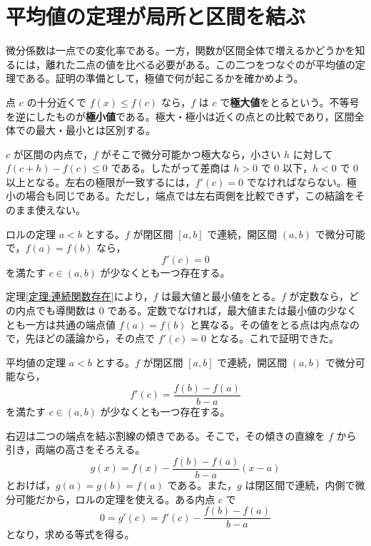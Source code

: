 \section{平均値の定理が局所と区間を結ぶ}\label{節:平均値定理}
微分係数は一点での変化率である。一方，関数が区間全体で増えるかどうかを知るには，離れた二点の値を比べる必要がある。この二つをつなぐのが平均値の定理である。証明の準備として，極値で何が起こるかを確かめよう。

点 $c$ の十分近くで $f(x)\le f(c)$ なら，$f$ は $c$ で\textbf{極大値}をとるという。不等号を逆にしたものが\textbf{極小値}である。極大・極小は近くの点との比較であり，区間全体での最大・最小とは区別する。

$c$ が区間の内点で，$f$ がそこで微分可能かつ極大なら，小さい $h$ に対して $f(c+h)-f(c)\le0$ である。したがって差商は $h>0$ で $0$ 以下，$h<0$ で $0$ 以上となる。左右の極限が一致するには，$f'(c)=0$ でなければならない。極小の場合も同じである。ただし，端点では左右両側を比較できず，この結論をそのまま使えない。

\begin{theorem}{ロルの定理}\label{定理:ロル}
$a<b$ とする。$f$ が閉区間 $[a,b]$ で連続，開区間 $(a,b)$ で微分可能で，$f(a)=f(b)$ なら，
\[
 f'(c)=0
\]
を満たす $c\in(a,b)$ が少なくとも一つ存在する。
\end{theorem}

定理\ref{定理:連続関数存在}により，$f$ は最大値と最小値をとる。$f$ が定数なら，どの内点でも導関数は $0$ である。定数でなければ，最大値または最小値の少なくとも一方は共通の端点値 $f(a)=f(b)$ と異なる。その値をとる点は内点なので，先ほどの議論から，その点で $f'(c)=0$ となる。これで証明できた。

\begin{theorem}{平均値の定理}\label{定理:平均値}
$a<b$ とする。$f$ が閉区間 $[a,b]$ で連続，開区間 $(a,b)$ で微分可能なら，
\[
 f'(c)=\frac{f(b)-f(a)}{b-a}
\]
を満たす $c\in(a,b)$ が少なくとも一つ存在する。
\end{theorem}

右辺は二つの端点を結ぶ割線の傾きである。そこで，その傾きの直線を $f$ から引き，両端の高さをそろえる。
\[
 g(x)=f(x)-\frac{f(b)-f(a)}{b-a}(x-a)
\]
とおけば，$g(a)=g(b)=f(a)$ である。また，$g$ は閉区間で連続，内側で微分可能だから，ロルの定理を使える。ある内点 $c$ で
\[
 0=g'(c)=f'(c)-\frac{f(b)-f(a)}{b-a}
\]
となり，求める等式を得る。

